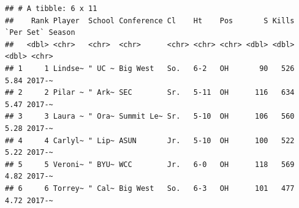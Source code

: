 \documentclass[]{book}
\newenvironment{Shaded}{\begin{snugshade}}{\end{snugshade}}
\newcommand{\CharTok}[1]{\textcolor[rgb]{0.31,0.60,0.02}{#1}}
\newcommand{\DataTypeTok}[1]{\textcolor[rgb]{0.13,0.29,0.53}{#1}}
\newcommand{\KeywordTok}[1]{\textcolor[rgb]{0.13,0.29,0.53}{\textbf{#1}}}
\newcommand{\NormalTok}[1]{#1}
\newcommand{\OperatorTok}[1]{\textcolor[rgb]{0.81,0.36,0.00}{\textbf{#1}}}
\newcommand{\OtherTok}[1]{\textcolor[rgb]{0.56,0.35,0.01}{#1}}
\newcommand{\StringTok}[1]{\textcolor[rgb]{0.31,0.60,0.02}{#1}}
\begin{document}
\begin{Shaded}
\end{Shaded}

\begin{verbatim}
## # A tibble: 6 x 11
##    Rank Player  School Conference Cl    Ht    Pos       S Kills `Per Set` Season
##   <dbl> <chr>   <chr>  <chr>      <chr> <chr> <chr> <dbl> <dbl>     <dbl> <chr> 
## 1     1 Lindse~ " UC ~ Big West   So.   6-2   OH       90   526      5.84 2017-~
## 2     2 Pilar ~ " Ark~ SEC        Sr.   5-11  OH      116   634      5.47 2017-~
## 3     3 Laura ~ " Ora~ Summit Le~ Sr.   5-10  OH      106   560      5.28 2017-~
## 4     4 Carlyl~ " Lip~ ASUN       Jr.   5-10  OH      100   522      5.22 2017-~
## 5     5 Veroni~ " BYU~ WCC        Jr.   6-0   OH      118   569      4.82 2017-~
## 6     6 Torrey~ " Cal~ Big West   So.   6-3   OH      101   477      4.72 2017-~
\end{verbatim}
\end{document}
